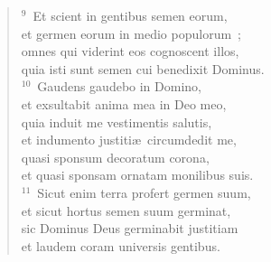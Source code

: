 \begin{verse}
${}^{9}$~Et scient in gentibus semen eorum,\\ et germen eorum in medio populorum~;\\ omnes qui viderint eos cognoscent illos,\\ quia isti sunt semen cui benedixit Dominus.\\
${}^{10}$~Gaudens gaudebo in Domino,\\ et exsultabit anima mea in Deo meo,\\ quia induit me vestimentis salutis,\\ et indumento justiti\ae\ circumdedit me,\\ quasi sponsum decoratum corona,\\ et quasi sponsam ornatam monilibus suis.\\
${}^{11}$~Sicut enim terra profert germen suum,\\ et sicut hortus semen suum germinat,\\ sic Dominus Deus germinabit justitiam\\ et laudem coram universis gentibus.\end{verse}



